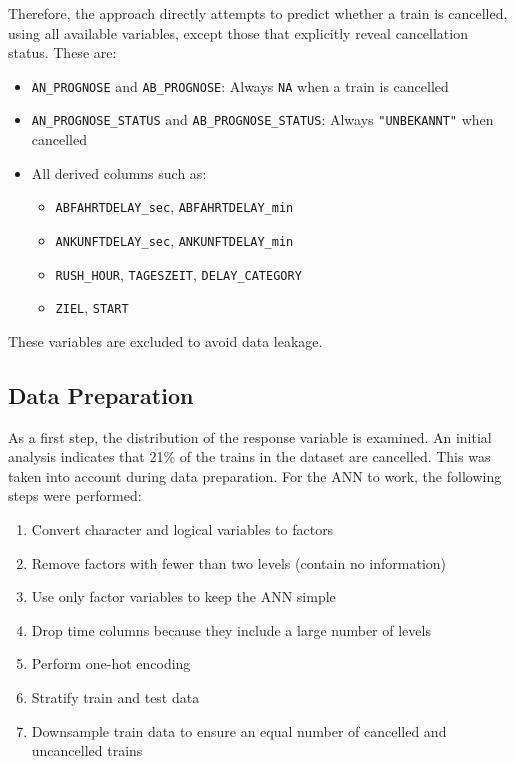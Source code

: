 \documentclass[
]{article}
\providecommand{\tightlist}{%
  \setlength{\itemsep}{0pt}\setlength{\parskip}{0pt}}
\begin{document}
Therefore, the approach directly attempts to predict whether a train is
cancelled, using all available variables, except those that explicitly
reveal cancellation status. These are:

\begin{itemize}
\tightlist
\item
  \texttt{AN\_PROGNOSE} and \texttt{AB\_PROGNOSE}: Always \texttt{NA}
  when a train is cancelled
\item
  \texttt{AN\_PROGNOSE\_STATUS} and \texttt{AB\_PROGNOSE\_STATUS}:
  Always \texttt{"UNBEKANNT"} when cancelled
\item
  All derived columns such as:

  \begin{itemize}
  \tightlist
  \item
    \texttt{ABFAHRTDELAY\_sec}, \texttt{ABFAHRTDELAY\_min}
  \item
    \texttt{ANKUNFTDELAY\_sec}, \texttt{ANKUNFTDELAY\_min}
  \item
    \texttt{RUSH\_HOUR}, \texttt{TAGESZEIT}, \texttt{DELAY\_CATEGORY}
  \item
    \texttt{ZIEL}, \texttt{START}
  \end{itemize}
\end{itemize}

These variables are excluded to avoid data leakage.

\subsection{Data Preparation}\label{data-preparation}

As a first step, the distribution of the response variable is examined.
An initial analysis indicates that 21\% of the trains in the dataset are
cancelled. This was taken into account during data preparation. For the
ANN to work, the following steps were performed:

\begin{enumerate}
\def\labelenumi{\arabic{enumi}.}
\tightlist
\item
  Convert character and logical variables to factors\\
\item
  Remove factors with fewer than two levels (contain no information)\\
\item
  Use only factor variables to keep the ANN simple\\
\item
  Drop time columns because they include a large number of levels\\
\item
  Perform one-hot encoding\\
\item
  Stratify train and test data\\
\item
  Downsample train data to ensure an equal number of cancelled and
  uncancelled trains
\end{enumerate}
\end{document}
